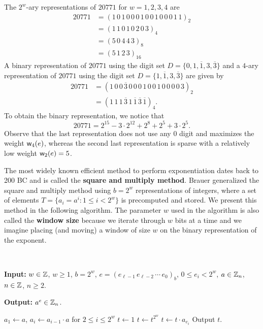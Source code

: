 \begin{exmp}
The $2^w$-ary representations of $20771$ for $w = 1, 2, 3, 4$ are 
\begin{align*}
    20771 &= (1\,0\,1\,0\,0\,0\,1\,0\,0\,1\,0\,0\,0\,1\,1)_2 \\
    &= (1\,1\,0\,1\,0\,2\,0\,3)_4 \\
    &= (5\,0\,4\,4\,3)_8 \\
    &= (5\,1\,2\,3)_{16}
\end{align*}
A binary representation of $20771$ using the digit set $D = \{0, 1, \overline1, 3, \overline3\}$ 
and a $4$-ary representation of $20771$ using the digit set $D = \{1, \overline1, 3, \overline3\}$ are given by 
\begin{align*}
    20771 &= (1\,0\,0\,\overline3\,0\,0\,0\,1\,0\,0\,1\,0\,0\,0\,0\,3)_2 \\
    &= (1\,1\,1\,\overline3\,1\,\overline1\,\overline3\,\overline1)_4.
\end{align*}
To obtain the binary representation, we notice that 
\[ 20771 = 2^{15} - 3 \cdot 2^{12} + 2^8 + 2^5 + 3 \cdot 2^5. \]
Observe that the last representation does not use any $0$ digit and maximizes the weight 
${\sf w}_4(e)$, whereas the second last representation is sparse with a relatively low weight ${\sf w}_2(e) = 5$.
\end{exmp}

The most widely known efficient method to perform exponentiation dates back to 200 BC and is called the 
{\bf square and multiply method}. Brauer \cite{bams/1183502136} generalized the square and multiply method using $b = 2^w$
representations of integers, where a set of elements $T = \{a_i = a^i : 1 \leq i < 2^w\}$ is 
precomputed and stored. We present this method in the following algorithm. The parameter 
$w$ used in the algorithm is also called the {\bf window size} because we iterate through $w$ 
bits at a time and we imagine placing (and moving) a window of size $w$ on the binary 
representation of the exponent. 

\begin{algo}~

{\bf Input:} $w \in \mathbb{Z}$, $w \geq 1$, $b = 2^w$, $e = (e_{\ell-1}\,e_{\ell-2}\,\cdots\,e_0)_b$, 
$0 \leq e_i < 2^w$, $a \in \mathbb{Z}_n$, $n \in \mathbb{Z}$, $n \geq 2$.

{\bf Output:} $a^e \in \mathbb{Z}_n$. \vspace{0.5em}

\begin{algorithmic}[1]
\State $a_1 \gets a$, $a_i \gets a_{i-1} \cdot a$ for $2 \leq i \leq 2^w$ 
\State $t \gets 1$
    \State $t \gets t^{2^w}$ 
        \State $t \gets t \cdot a_{e_i}$ 
    \EndIf
\EndFor
\State Output $t$. 
\end{algorithmic}
\end{algo}


